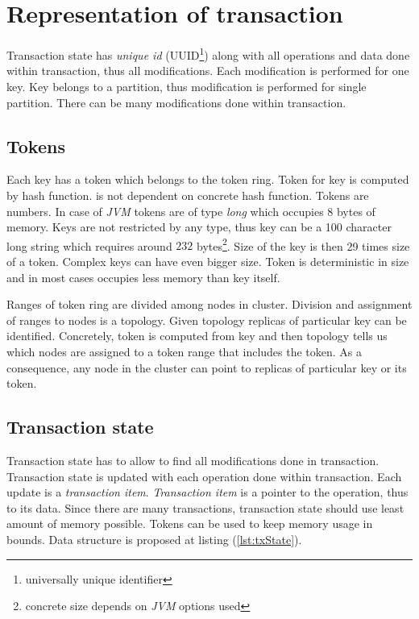
\section{Representation of transaction}
Transaction state has \emph{unique id} (UUID\footnote{universally unique identifier}) along with all operations and data done within transaction, thus all modifications. 
Each modification is performed for one key. Key belongs to a partition, thus modification is performed for single partition. There can be many modifications done within transaction. 

\subsection{Tokens}
Each key has a token which belongs to the token ring. Token for key is computed by hash function. \mpp is not dependent on concrete hash function. Tokens are numbers. In case of \emph{JVM} tokens are of type \emph{long} which occupies 8 bytes of memory. Keys are not restricted by any type, thus key can be a 100 character long string which requires around $232$ bytes\footnote{concrete size depends on \emph{JVM} options used}. Size of the key is then 29 times size of a token. Complex keys can have even bigger size. Token is deterministic in size and in most cases occupies less memory than key itself.

Ranges of token ring are divided among nodes in cluster. Division and assignment of ranges to nodes is a topology. Given topology replicas of particular key can be identified. Concretely, token is computed from key and then topology tells us which nodes are assigned to a token range that includes the token. As a consequence, any node in the cluster can point to replicas of particular key or its token.


\subsection{Transaction state}
Transaction state has to allow to find all modifications done in transaction. Transaction state is updated with each operation done within transaction. Each update is a \emph{transaction item}. \emph{Transaction item} is a pointer to the operation, thus to its data. Since there are many transactions, transaction state should use least amount of memory possible. Tokens can be used to keep memory usage in bounds. Data structure is proposed at listing (\ref{lst:txState}).

